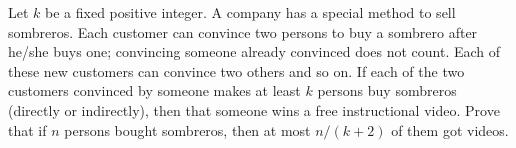Let $k$ be a fixed positive integer. A company has a special method to sell sombreros. Each customer can convince two persons to buy a sombrero after he/she buys one; convincing someone already convinced does not count. Each of these new customers can convince two others and so on. If each of the two customers convinced by someone makes at least $k$ persons buy sombreros (directly or indirectly), then that someone wins a free instructional video. Prove that if $n$ persons bought sombreros, then at most $n/(k + 2)$ of them got videos.
